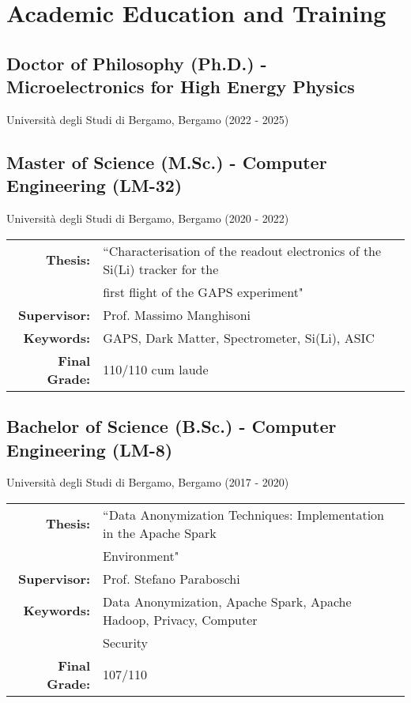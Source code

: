 \documentclass[11pt]{article}
\begin{document}
\bigskip
\section*{Academic Education and Training }

\subsection*{Doctor of Philosophy (Ph.D.) -  Microelectronics for High Energy Physics}
Università degli Studi di Bergamo, Bergamo (2022 - 2025)\\

\subsection*{Master of Science (M.Sc.) - Computer Engineering (LM-32)}
Università degli Studi di Bergamo, Bergamo (2020 - 2022)\\
\vspace{-10pt}
\begin{longtable}{r l}
    \renewcommand{\arraystretch}{1.5}
     \textbf{Thesis:} & ``Characterisation of the readout electronics of the Si(Li) tracker for the \\
     & first flight of the GAPS experiment" \\
     \textbf{Supervisor:} & Prof. Massimo Manghisoni \\
     \textbf{Keywords:} & GAPS, Dark Matter, Spectrometer, Si(Li), ASIC \\
     \textbf{Final Grade:} & 110/110 cum laude
\end{longtable}

\subsection*{Bachelor of Science (B.Sc.) - Computer Engineering (LM-8)}
Università degli Studi di Bergamo, Bergamo (2017 - 2020)\\
\vspace{-10pt}
\begin{longtable}{r l}
    \renewcommand{\arraystretch}{1.5}
     \textbf{Thesis:} & ``Data Anonymization Techniques: Implementation in the Apache Spark \\
     & Environment" \\
     \textbf{Supervisor:} & Prof. Stefano Paraboschi \\
     \textbf{Keywords:} & Data Anonymization, Apache Spark, Apache Hadoop, Privacy, Computer\\
     & Security \\
     \textbf{Final Grade:} & 107/110
\end{longtable}
\end{document}
